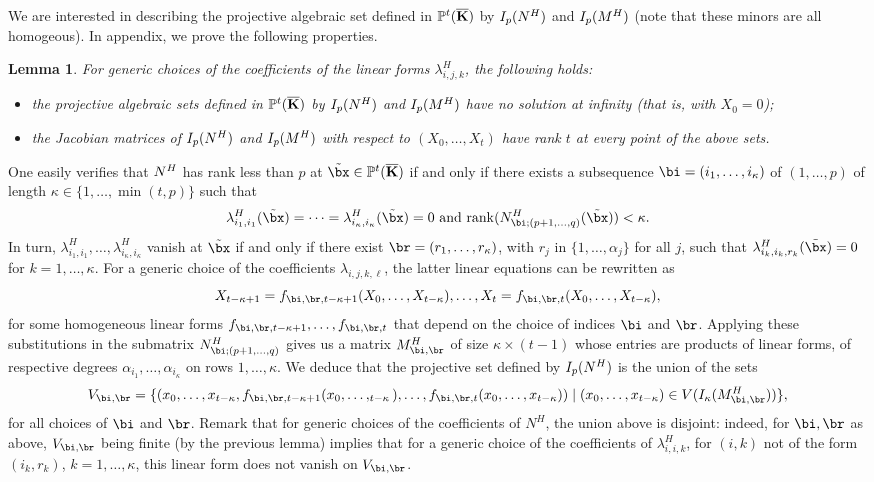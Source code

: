 \documentclass[12pt]{article}
\newtheorem{lemma}[definition]{Lemma}
\begin{document}
We are interested in describing the projective algebraic set defined
in $\mathbb{P}^t(\overline{\mathbf{K}})$ by $I_p({N}^H)$ and $I_p({M}^H)$ (note that these
minors are all homogeous). In appendix, we prove the following
properties.
\begin{lemma}\label{lemma:appendix}
  For generic choices of the coefficients of the linear forms
  $\lambda^H_{i,j,k}$, the following holds:
  \begin{itemize}
  \item the projective algebraic sets defined in $\mathbb{P}^t(\overline{\mathbf{K}})$ by
    $I_p({N}^H)$ and $I_p({M}^H)$ have no solution at infinity (that is,
    with $X_0=0$);
  \item the Jacobian matrices of $I_p({N}^H)$ and $I_p({M}^H)$ with
    respect to $(X_0,\dots,X_t)$ have rank $t$ at every point of the above
    sets.
\end{itemize}
\end{lemma}
 One easily verifies that ${N}^H$ has rank less than $p$ at
$\tilde \bx \in \P^t(\KKbar)$ if and only if there exists a
subsequence $\bi=(i_1,\dots,i_\kappa)$ of $(1,\dots,p)$ of length
$\kappa\in \{1,\dots,\min(t,p)\}$ such that
$$ \lambda^H_{i_1,i_1}(\tilde\bx) =
\cdots = \lambda^H_{i_\kappa,i_\kappa}(\tilde\bx) = 0
\text{~and~}
\rank(\mN^H_{\bi;(p+1,\dots,q)}(\tilde\bx)) < \kappa.$$
In turn, $\lambda^H_{i_1,i_1},\dots,\lambda^H_{i_\kappa,i_\kappa}$
vanish at $\tilde\bx$ if and only if there exist
$\br=(r_1,\dots,r_\kappa)$, with $r_j$ in $\{1,\dots,\alpha_j\}$ 
for all $j$, such that $\lambda^H_{i_k,i_k,r_k}(\tilde\bx)=0$ 
for $k=1,\dots,\kappa$. For a generic choice of the coefficients 
$\lambda_{i,j,k,\ell}$, the latter linear equations can be rewritten
as 
$$X_{t-\kappa+1}=f_{\bi,\br,t-\kappa+1}(X_0,\dots,X_{t-\kappa}),\dots,
X_{t}=f_{\bi,\br,t}(X_0,\dots,X_{t-\kappa}),$$ for some homogeneous
linear forms $f_{\bi,\br,t-\kappa+1},\dots,f_{\bi,\br,t}$ that depend
on the choice of indices $\bi$ and $\br$. Applying these
substitutions in the submatrix $\mN^H_{\bi;(p+1,\dots,q)}$ gives us a
matrix $\mM^H_{\bi,\br}$ of size $\kappa \times (t-1)$ whose entries
are products of linear forms, of respective degrees
$\alpha_{i_1},\dots,\alpha_{i_\kappa}$ on rows $1,\dots,\kappa$. We
deduce that the projective set defined by $I_p({N}^H)$ is the union of the sets
$$V_{\bi,\br}=\{
(x_0,\dots,x_{t-\kappa},f_{\bi,\br,t-\kappa+1}(x_0,\dots,_{t-\kappa}),\dots,
f_{\bi,\br,t}(x_0,\dots,x_{t-\kappa})) \mid (x_0,\dots,x_{t-\kappa})
\in V(I_\kappa(\mM^H_{\bi,\br})) \},$$ for all choices of $\bi$ and
$\br$.  Remark that for generic choices of the coefficients of $N^H$, the union
above is disjoint: indeed, for $\bi,\br$ as above, $V_{\bi,\br}$ being
finite (by the previous lemma) implies that for a generic choice of
the coefficients of $\lambda^H_{i,i,k}$, for $(i,k)$ not of the form
$(i_k,r_k)$, $k=1,\dots,\kappa$, this linear form does not vanish on
$V_{\bi,\br}$.
\end{document}
